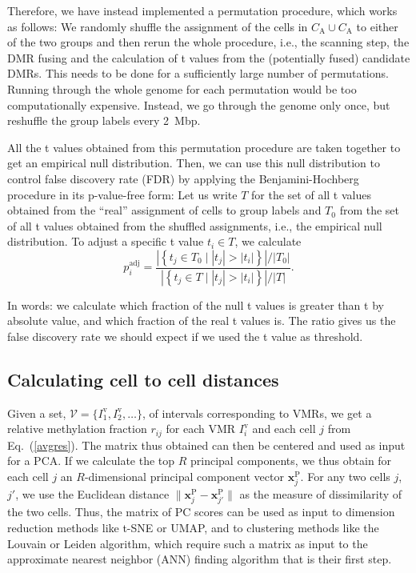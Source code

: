 \documentclass[twocolumn,10pt]{article}
\begin{document}
Therefore, we have instead implemented a permutation procedure, which works as follows:
We randomly shuffle the assignment of the cells in $C_\text{A}\cup C_\text{A}$ to either of the two groups and then rerun the whole procedure, i.e., the scanning step, the DMR fusing and the calculation of t values from the (potentially fused) candidate DMRs.
This needs to be done for a sufficiently large number of permutations.
Running through the whole genome for each permutation would be too computationally expensive.
Instead, we go through the genome only once, but reshuffle the group labels every 2~Mbp.

All the t values obtained from this permutation procedure are taken together to get an empirical null distribution.
Then, we can use this null distribution to control false discovery rate (FDR) by applying the Benjamini-Hochberg procedure in its p-value-free form:
Let us write $T$ for the set of all t values obtained from the ``real'' assignment of cells to group labels and $T_0$ from the set of all t values obtained from the shuffled assignments, i.e., the empirical null distribution.
To adjust a specific t value $t_i\in T$, we calculate
\[ p^\text{adj}_i = \frac{ \left|\left\{t_j\in T_0\mid|t_j| > |t_i| \right\}\right| \big/ |T_0|}
{ \left|\left\{t_j\in T\mid|t_j| > |t_i| \right\}\right| \big/ |T|}.\]

In words: we calculate which fraction of the null t values is greater than t by absolute value, and which fraction of the real t values is.
The ratio gives us the false discovery rate we should expect if we used the t value as threshold.


\subsection{Calculating cell to cell distances}

Given a set, $\mathcal{V}=\{I^\text{v}_1,I^\text{v}_2,\dots\}$, of intervals corresponding to VMRs, we get a relative methylation fraction $r_{ij}$ for each VMR $I^\text{v}_i$ and each cell $j$ from Eq.\ (\ref{avgres}).
The matrix thus obtained can then be centered and used as input for a PCA.
If we calculate the top $R$ principal components, we thus obtain for each cell $j$ an $R$-dimensional principal component vector $\mathbf{x}^\text{P}_j$.
For any two cells $j$, $j'$, we use the Euclidean distance $\|\mathbf{x}^\text{P}_j - \mathbf{x}^\text{P}_{j'}\|$ as the measure of dissimilarity of the two cells.
Thus, the matrix of PC scores can be used as input to dimension reduction methods like t-SNE or UMAP, and to clustering methods like the Louvain or Leiden algorithm, which require such a matrix as input to the approximate nearest neighbor (ANN) finding algorithm that is their first step.
\end{document}

